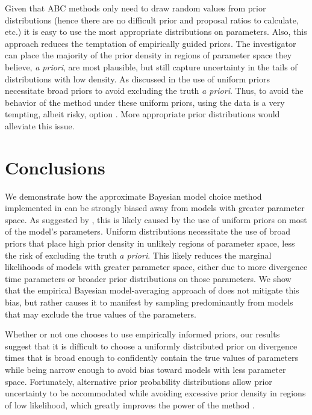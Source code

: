 \documentclass[letterpaper,12pt]{article}
\begin{document}
\begin{linenumbers}
Given that ABC methods only need to draw random values from prior distributions
(hence there are no difficult prior and proposal ratios to calculate, etc.) it
is easy to use the most appropriate distributions on parameters.
Also, this approach reduces the temptation of empirically guided priors.
The investigator can place the majority of the prior density in regions of
parameter space they believe, \emph{a priori}, are most plausible, but still
capture uncertainty in the tails of distributions with low density.
As discussed in \citet{Oaks2012} the use of uniform priors necessitate
broad priors to avoid excluding the truth \emph{a priori}.
Thus, to avoid the behavior of the method under these uniform priors, using the
data is a very tempting, albeit risky, option \citep{Hickerson2013}.
More appropriate prior distributions would alleviate this issue.





\section*{Conclusions}
We demonstrate how the approximate Bayesian model choice method implemented in
\msb can be strongly biased away from models with greater parameter space.
As suggested by \citet{Oaks2012}, this is likely caused by the use of uniform
priors on most of the model's parameters.
Uniform distributions necessitate the use of broad priors that place high prior
density in unlikely regions of parameter space, less the risk of excluding the
truth \emph{a priori}.
This likely reduces the marginal likelihoods of models with greater parameter
space, either due to more divergence time parameters or broader prior
distributions on those parameters.
We show that the empirical Bayesian model-averaging approach of
\citet{Hickerson2013} does not mitigate this bias, but rather causes it to
manifest by sampling predominantly from models that may exclude the true values
of the parameters.

Whether or not one chooses to use empirically informed priors, our results
suggest that it is difficult to choose a uniformly distributed prior on
divergence times that is broad enough to confidently contain the true values of
parameters while being narrow enough to avoid bias toward models with less
parameter space.
Fortunately, alternative prior probability distributions allow prior
uncertainty to be accommodated while avoiding excessive prior density in
regions of low likelihood, which greatly improves the power of the method
\citet{Oaks2014dpp}.


\end{linenumbers}
\end{document}
